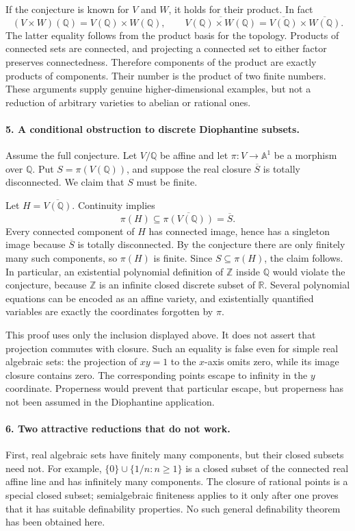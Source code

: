 \documentclass[11pt]{article}
\begin{document}
If the conjecture is known for $V$ and $W$, it holds for their product. In fact
\[
 (V\times W)(\mathbb Q)=V(\mathbb Q)\times W(\mathbb Q),
 \qquad
 \overline{V(\mathbb Q)\times W(\mathbb Q)}
 =\overline{V(\mathbb Q)}\times\overline{W(\mathbb Q)}.
\]
The latter equality follows from the product basis for the topology. Products of connected sets are connected, and projecting a connected set to either factor preserves connectedness. Therefore components of the product are exactly products of components. Their number is the product of two finite numbers. These arguments supply genuine higher-dimensional examples, but not a reduction of arbitrary varieties to abelian or rational ones.

\paragraph{5. A conditional obstruction to discrete Diophantine subsets.}
Assume the full conjecture. Let $V/\mathbb Q$ be affine and let $\pi:V\to\mathbb A^1$ be a morphism over $\mathbb Q$. Put $S=\pi(V(\mathbb Q))$, and suppose the real closure $\overline S$ is totally disconnected. We claim that $S$ must be finite.

Let $H=\overline{V(\mathbb Q)}$. Continuity implies
\[
 \pi(H)\subseteq\overline{\pi(V(\mathbb Q))}=\overline S.
\]
Every connected component of $H$ has connected image, hence has a singleton image because $\overline S$ is totally disconnected. By the conjecture there are only finitely many such components, so $\pi(H)$ is finite. Since $S\subseteq\pi(H)$, the claim follows. In particular, an existential polynomial definition of $\mathbb Z$ inside $\mathbb Q$ would violate the conjecture, because $\mathbb Z$ is an infinite closed discrete subset of $\mathbb R$. Several polynomial equations can be encoded as an affine variety, and existentially quantified variables are exactly the coordinates forgotten by $\pi$.

This proof uses only the inclusion displayed above. It does not assert that projection commutes with closure. Such an equality is false even for simple real algebraic sets: the projection of $xy=1$ to the $x$-axis omits zero, while its image closure contains zero. The corresponding points escape to infinity in the $y$ coordinate. Properness would prevent that particular escape, but properness has not been assumed in the Diophantine application.

\paragraph{6. Two attractive reductions that do not work.}
First, real algebraic sets have finitely many components, but their closed subsets need not. For example, $\{0\}\cup\{1/n:n\geq1\}$ is a closed subset of the connected real affine line and has infinitely many components. The closure of rational points is a special closed subset; semialgebraic finiteness applies to it only after one proves that it has suitable definability properties. No such general definability theorem has been obtained here.
\end{document}
